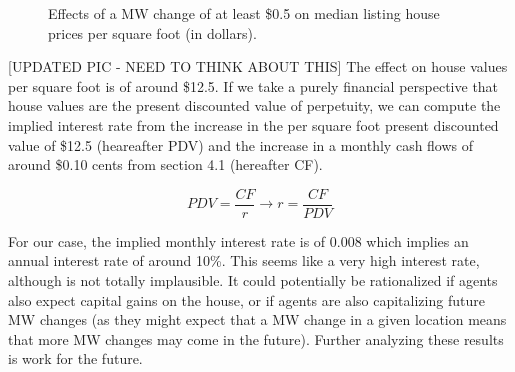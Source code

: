 \begin{figure}[h!]
    \centering
    \caption{Effects of a MW change of at least \$0.5 on median listing house prices per square foot (in dollars).}
    \label{fig:eventprice_level_sal_w6}
\end{figure}

[UPDATED PIC - NEED TO THINK ABOUT THIS]
The effect on house values per square foot is of around \$12.5. If we take a purely financial perspective that house values are the present discounted value of perpetuity, we can compute the implied interest rate from the increase in the per square foot present discounted value of \$12.5 (heareafter PDV) and the increase in a monthly cash flows of around \$0.10 cents from section 4.1 (hereafter CF).

\begin{equation}
    PDV = \frac{CF}{r} \to r = \frac{CF}{PDV}
\end{equation}

For our case, the implied monthly interest rate is of 0.008 which implies an annual interest rate of around 10\%. This seems like a very high interest rate, although is not totally implausible. It could potentially be rationalized if agents also expect capital gains on the house, or if agents are also capitalizing future MW changes (as they might expect that a MW change in a given location means that more MW changes may come in the future). Further analyzing these results is work for the future. 